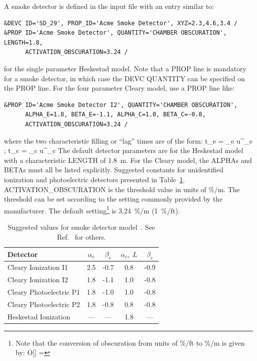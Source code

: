 \documentclass[11pt]{book}
\begin{document}
A smoke detector is defined in the input file with an entry similar to:
\begin{lstlisting}
&DEVC ID='SD_29', PROP_ID='Acme Smoke Detector', XYZ=2.3,4.6,3.4 /
&PROP ID='Acme Smoke Detector', QUANTITY='CHAMBER OBSCURATION', LENGTH=1.8,
      ACTIVATION_OBSCURATION=3.24 /
\end{lstlisting}
for the single parameter Heskestad model. Note that a {\ct PROP} line is mandatory for a smoke detector, in which case the {\ct DEVC QUANTITY} can be specified on the {\ct PROP} line. For the four parameter Cleary model, use a {\ct PROP} line like:
\begin{lstlisting}
&PROP ID='Acme Smoke Detector I2', QUANTITY='CHAMBER OBSCURATION',
      ALPHA_E=1.8, BETA_E=-1.1, ALPHA_C=1.0, BETA_C=-0.8,
      ACTIVATION_OBSCURATION=3.24 /
\end{lstlisting}
where the two characteristic filling or ``lag'' times are of the form:
\be
   \delta t_e = \alpha_e u^{\beta_e} \quad ; \quad \delta t_c = \alpha_c u^{\beta_c}
\ee
The default detector parameters are for the Heskestad model with a characteristic {\ct LENGTH} of 1.8~m. For the Cleary model, the {\ct ALPHA}s and {\ct BETA}s must all be listed explicitly. Suggested constants for unidentified ionization and photoelectric detectors presented in Table~\ref{tab:sdvalues}. {\ct ACTIVATION\_OBSCURATION} is the threshold value in units of \%/m. The threshold can be set according to the setting commonly provided by the manufacturer. The default setting\footnote{Note that the conversion of obscuration from units of \%/ft to \%/m is given by:
\be
   O[] =  
\ee
} is 3.24~\%/m (1~\%/ft).

\begin{table}[ht]
\caption[Suggested values for smoke detector model]{Suggested values for smoke detector model~\cite{Cleary:IAFSS6}. See Ref.~\cite{SFPE} for others.}
\vspace{0.1in}
\label{tab:sdvalues}
\begin{center}
\begin{tabular}{|l||c|c|c|c|}
\hline
Detector                      & $\alpha_e$  &  $\beta_e$   &  $\alpha_c, \; L$   &  $\beta_c$  \\ \hline \hline
Cleary Ionization    I1       & 2.5         & -0.7         &  0.8                &  -0.9      \\ \hline
Cleary Ionization    I2       & 1.8         & -1.1         &  1.0                &  -0.8      \\ \hline
Cleary Photoelectric P1       & 1.8         & -1.0         &  1.0                &  -0.8      \\ \hline
Cleary Photoelectric P2       & 1.8         & -0.8         &  0.8                &  -0.8      \\ \hline
Heskestad Ionization          & ---         & ---          &  1.8                &  ---       \\ \hline\end{tabular}
\end{center}
\end{table}
\end{document}
